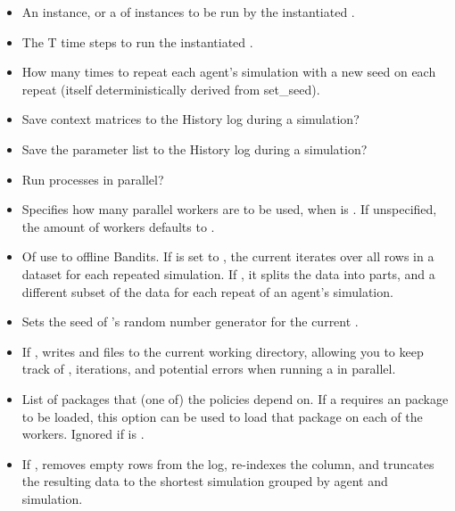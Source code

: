 \documentclass{jss}\usepackage[]{graphicx}\usepackage[]{color}
\begin{document}
\begin{itemize}
   \item{}{
     An  instance, or a  of  instances to be run by the instantiated .
   }
   \item{}{
     The T time steps to run the instantiated .
   }
   \item{}{
     How many times to repeat each agent's simulation with a new seed on each repeat (itself deterministically derived from set\_seed).
   }
   \item{}{
     Save context matrices  to the History log during a simulation?
   }
   \item{}{
     Save the parameter list  to the History log during a simulation?
   }
   \item{}{
      Run  processes in parallel?
   }
   \item{}{
      Specifies how many parallel workers are to be used, when  is . If unspecified, the amount of workers defaults to .
   }
   \item{}{
      Of use to offline Bandits.
      If  is set to , the current 
      iterates over all rows in a dataset for each repeated simulation.
      If , it splits the data into  parts,
      and a different subset of the data for each repeat of an agent's simulation.
   }
   \item{}{
      Sets the seed of 's random number generator for the current .
   }
   \item{}{
       If ,  writes  and 
       files to the current working directory, allowing you to keep track of , iterations,
       and potential errors when running a  in parallel.
   }
   \item{}{
       List of packages that (one of) the policies depend on. If a  requires an
        package to be loaded, this option can be used to load that package on each of the workers.
       Ignored if  is .
   }
   \item{}{
      If , removes empty rows from the  log,
      re-indexes the  column, and truncates the resulting data to the shortest simulation
      grouped by agent and simulation.
   }
\end{itemize}
\end{document}
